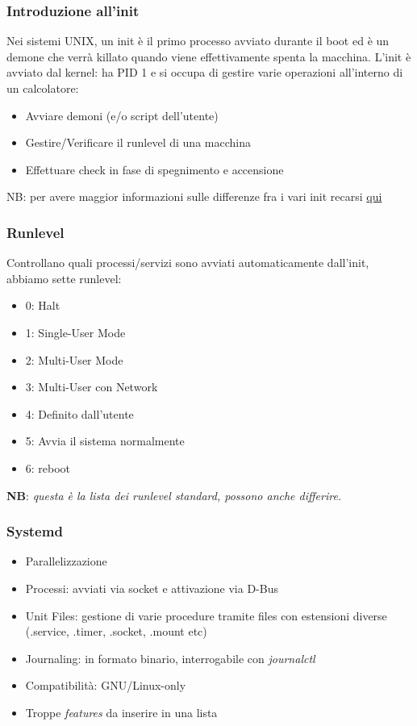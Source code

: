 \documentclass{beamer}
\begin{document}
\begin{frame}
\frametitle{Introduzione all'init}
Nei sistemi UNIX, un init \`e il primo processo avviato durante il boot ed \`e un demone che verr\`a killato quando viene effettivamente spenta la macchina. L'init \`e avviato dal kernel: ha PID 1 e si occupa di gestire varie operazioni all'interno di un calcolatore:
\begin{itemize}
	\item Avviare demoni (e/o script dell'utente)
	\item Gestire/Verificare il runlevel di una macchina
	\item Effettuare check in fase di spegnimento e accensione \\
\end{itemize}

NB: per avere maggior informazioni sulle differenze fra i vari init recarsi \href{http://wiki.gentoo.org/wiki/Talk:Comparison_of_init_systems}{qui}
\end{frame}


\begin{frame}
\frametitle{Runlevel}
Controllano quali processi/servizi sono avviati automaticamente dall'init, abbiamo sette runlevel:
\begin{itemize}
	\item 0: Halt
	\item 1: Single-User Mode
	\item 2: Multi-User Mode
	\item 3: Multi-User con Network
	\item 4: Definito dall'utente
	\item 5: Avvia il sistema normalmente
	\item 6: reboot
\end{itemize}

\textbf{NB}: \textit{questa \`e la lista dei runlevel standard, possono anche differire.}
\end{frame}


\begin{frame}
\frametitle{Systemd}
\begin{itemize}
	\item Parallelizzazione
	\item Processi: avviati via socket e attivazione via D-Bus
	\item Unit Files: gestione di varie procedure tramite files con estensioni diverse (.service, .timer, .socket, .mount etc)
	\item Journaling: in formato binario, interrogabile con \textit{journalctl}
	\item Compatibilit\`a: GNU/Linux-only
	\item Troppe \textit{features} da inserire in una lista
\end{itemize}
\end{frame}
\end{document}
